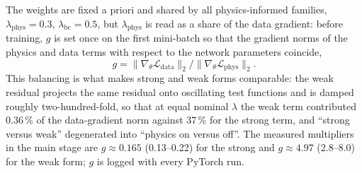 \documentclass[subscriptcorrection,upint,varvw,barcolor=Goldenrod3,mathalfa=cal=euler,balance,hyphenate,french,pdf-a]{asmejour} %
\begin{document}
The weights are fixed a priori and shared by all physics-informed families,
$\lambda_{\mathrm{phys}}=0.3$, $\lambda_{\mathrm{bc}}=0.5$,
but $\lambda_{\mathrm{phys}}$ is read as a share of the data gradient: before
training, $g$ is set once on the first mini-batch so that the gradient norms of
the physics and data terms with respect to the network parameters coincide,
\begin{equation}
  g = \lVert\nabla_{\theta}\mathcal{L}_{\mathrm{data}}\rVert_2 \big/
      \lVert\nabla_{\theta}\mathcal{L}_{\mathrm{phys}}\rVert_2 .
  \label{eq:calib}
\end{equation}
This balancing \citep{wang2022} is what makes strong and weak
forms comparable: the weak residual projects the same residual onto oscillating
test functions and is damped roughly two-hundred-fold, so that at equal nominal
$\lambda$ the weak term contributed 0.36\,\% of the data-gradient norm against
37\,\% for the strong term, and ``strong versus weak'' degenerated into ``physics
on versus off''.
The measured multipliers in the main stage are $g\approx0.165$ (0.13--0.22) for
the strong and $g\approx4.97$ (2.8--8.0) for the weak form; $g$ is logged with
every PyTorch run.
\end{document}
